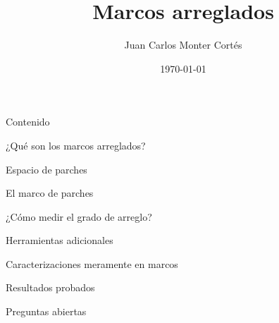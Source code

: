 \documentclass[compress,12pt]{beamer}
\title{Marcos arreglados}
\date{\today}
\author{Juan Carlos Monter Cortés}
\institute{Universidad de Guadalajara}
\begin{document}
\frame[plain]{\titlepage}

\begin{frame}{Contenido}
\tableofcontents %
\end{frame}

\begin{frame}{¿Qué son los marcos arreglados?}
    
\end{frame}

\begin{frame}{Espacio de parches}
    
\end{frame}

\begin{frame}{El marco de parches}
    
\end{frame}

\begin{frame}{¿Cómo medir el grado de arreglo?}
    
\end{frame}

\begin{frame}{Herramientas adicionales}
    
\end{frame}

\begin{frame}{Caracterizaciones meramente en marcos}
    
\end{frame}

\begin{frame}{Resultados probados}
    
\end{frame}

\begin{frame}{Preguntas abiertas}
    
\end{frame}
\end{document}
